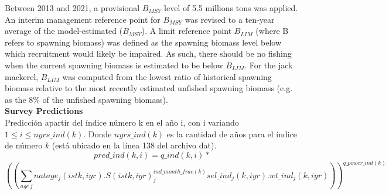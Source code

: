\documentclass{article}
\begin{document}
Between 2013 and 2021, a provisional \(B_{MSY}\) level of 5.5 millions tons was applied. 
An interim management reference point for \(B_{MSY}\) was revised to a ten-year average of the model-estimated (\(B_{MSY}\)). 
A limit reference point \(B_{LIM}\) (where B refers to spawning biomass) was defined as the spawning biomass level below which recruitment would likely be impaired. As such, there should be no fishing when the current spawning biomass is estimated to be below \(B_{LIM}\).
For the jack mackerel, \(B_{LIM}\) was computed from the lowest ratio of historical spawning biomass relative to the most recently estimated unfished spawning biomass (e.g. as the 8\% of the unfished spawning biomass).\\





\textbf{Survey Predictions}\\
Predicción apartir del índice número k en el año i, con i variando $1\leq i \leq nyrs\_ind(k)$. Donde $nyrs\_ind(k)$ es la cantidad de años para el índice de número $k$ (está ubicado en la línea 138 del archivo dat).
\begin{equation}
    pred\_ind(k,i)=q\_ind(k,i)* 
\end{equation}
\begin{equation}
    \left(\left(\sum_{age \ j}natage_j(istk,iyr).S(istk,iyr)_j^{ind\_month\_frac(k)}sel\_ind_j(k,iyr).wt\_ind_j(k,iyr)\right)\right)^{q\_power\_ind(k)}
\end{equation}
\end{document}
